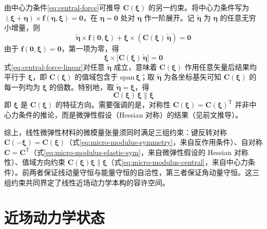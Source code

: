 由中心力条件\eqref{eq:central-force}可推导 $\mathbf{C}(\boldsymbol{\xi})$ 的另一约束。将中心力条件写为 $(\boldsymbol{\xi}+\boldsymbol{\eta})\times\mathbf{f}(\boldsymbol{\eta},\boldsymbol{\xi})=\mathbf{0}$，在 $\boldsymbol{\eta}=\mathbf{0}$ 处对 $\boldsymbol{\eta}$ 作一阶展开。记 $\tilde{\boldsymbol{\eta}}$ 为 $\boldsymbol{\eta}$ 的任意无穷小增量，则
\begin{equation}
  \tilde{\boldsymbol{\eta}}\times\mathbf{f}(\mathbf{0},\boldsymbol{\xi})+\boldsymbol{\xi}\times\left(\mathbf{C}(\boldsymbol{\xi})\,\tilde{\boldsymbol{\eta}}\right)=\mathbf{0}
  \label{eq:central-force-variation}
\end{equation}
由于 $\mathbf{f}(\mathbf{0},\boldsymbol{\xi})=\mathbf{0}$，第一项为零，得
\begin{equation}
  \boldsymbol{\xi}\times\bigl[\mathbf{C}(\boldsymbol{\xi})\,\tilde{\boldsymbol{\eta}}\bigr]=\mathbf{0}
  \label{eq:central-force-linear}
\end{equation}
式\eqref{eq:central-force-linear}对任意 $\tilde{\boldsymbol{\eta}}$ 成立，意味着 $\mathbf{C}(\boldsymbol{\xi})$ 作用任意矢量后结果均平行于 $\boldsymbol{\xi}$，即 $\mathbf{C}(\boldsymbol{\xi})$ 的值域包含于 $\mathrm{span}\,\boldsymbol{\xi}$；取 $\tilde{\boldsymbol{\eta}}$ 为各坐标基矢可知 $\mathbf{C}(\boldsymbol{\xi})$ 的每一列均为 $\boldsymbol{\xi}$ 的倍数。特别地，取 $\tilde{\boldsymbol{\eta}}=\boldsymbol{\xi}$，得
\begin{equation}
  \mathbf{C}(\boldsymbol{\xi})\,\boldsymbol{\xi}\parallel\boldsymbol{\xi}
  \label{eq:micro-modulus-central}
\end{equation}
即 $\boldsymbol{\xi}$ 是 $\mathbf{C}(\boldsymbol{\xi})$ 的特征方向。需要强调的是，对称性 $\mathbf{C}(\boldsymbol{\xi})=\mathbf{C}(\boldsymbol{\xi})^{\mathrm{T}}$ 并非中心力条件的推论，而是微弹性假设（Hessian 对称）的结果（见前文推导）。

综上，线性微弹性材料的微模量张量须同时满足三组约束：键反转对称 $\mathbf{C}(-\boldsymbol{\xi})=\mathbf{C}(\boldsymbol{\xi})$（式\eqref{eq:micro-modulus-symmetry}，来自反作用条件）、自对称 $\mathbf{C}=\mathbf{C}^{\mathrm{T}}$（式\eqref{eq:micro-modulus-elastic-sym}，来自微弹性假设的 Hessian 对称性）、值域方向约束 $\mathbf{C}(\boldsymbol{\xi})\boldsymbol{\xi}\parallel\boldsymbol{\xi}$（式\eqref{eq:micro-modulus-central}，来自中心力条件）。前两者保证线动量守恒与能量守恒的自洽性，第三者保证角动量守恒。这三组约束共同界定了线性近场动力学本构的容许空间。




\section{近场动力学状态}

